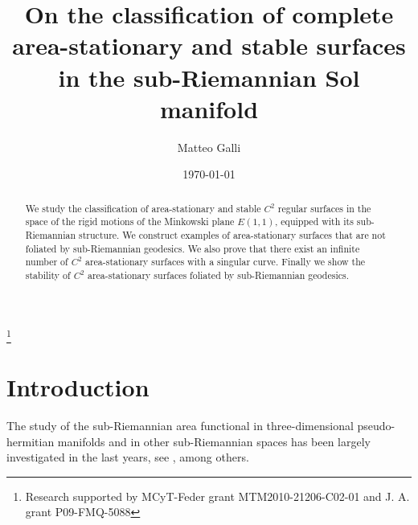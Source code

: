 \documentclass[10pt]{amsart}
\theoremstyle{definition}
\theoremstyle{remark}
\numberwithin{equation}{section}
\begin{document}
\title[Area-stationary and stable surfaces in Sol]{On the classification of complete area-stationary and stable surfaces in the sub-Riemannian Sol manifold}

\author[M.~Galli]{Matteo Galli} \address{Departamento de
Geometr\'{\i}a y Topolog\'{\i}a \\
Universidad de Granada \\ E--18071 Granada \\ Espa\~na}

\date{\today}

\thanks{Research supported by  MCyT-Feder grant MTM2010-21206-C02-01 and J. A. grant P09-FMQ-5088}

\begin{abstract}
We study the classification of area-stationary and stable $C^2$ regular surfaces in the space of the rigid motions of the Minkowski plane ${E(1,1)}$, equipped with its sub-Riemannian structure. We construct examples of area-stationary surfaces that are not foliated by sub-Riemannian geodesics. We also prove that there exist an infinite number of $C^2$ area-stationary surfaces with a singular curve. Finally we show the stability of $C^2$ area-stationary surfaces foliated by sub-Riemannian geodesics. 
\end{abstract}

\maketitle

\thispagestyle{empty}



\tableofcontents

\section{Introduction}

The study of the sub-Riemannian area functional in three-dimensional pseudo-hermitian manifolds and in other sub-Riemannian spaces has been largely investigated in the last years, see \cite{Am-SC-Vi, MR2831583, BA-SC-Vi, MR2600502, MR2583494,  ChengHwang2nd,  CJHMY2,  CJHMY, CHY, DGNAV, DGNnotable,  Da-Ga-Nh-Pa, MR3044134, MR2979606, Ga-Nh,  Hl-Pa2, Ri-Ro-Hu,  Hu-Ro, Hu-Ro2, Ri1,  Ri-Ro, Ro,      Sh}, among others. 
\end{document}
